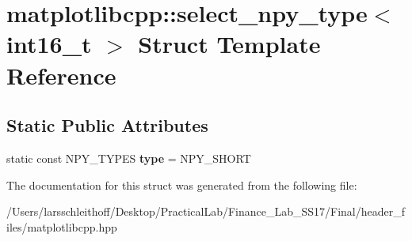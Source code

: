 \hypertarget{structmatplotlibcpp_1_1select__npy__type_3_01int16__t_01_4}{}\section{matplotlibcpp\+:\+:select\+\_\+npy\+\_\+type$<$ int16\+\_\+t $>$ Struct Template Reference}
\label{structmatplotlibcpp_1_1select__npy__type_3_01int16__t_01_4}
\subsection*{Static Public Attributes}
\begin{DoxyCompactItemize}
\item 
\mbox{\label{structmatplotlibcpp_1_1select__npy__type_3_01int16__t_01_4_aa7e1803c594ccc58c2cd4c8818d5a158}} 
static const N\+P\+Y\+\_\+\+T\+Y\+P\+ES {\bfseries type} = N\+P\+Y\+\_\+\+S\+H\+O\+RT
\end{DoxyCompactItemize}


The documentation for this struct was generated from the following file\+:\begin{DoxyCompactItemize}
\item 
/\+Users/larsschleithoff/\+Desktop/\+Practical\+Lab/\+Finance\+\_\+\+Lab\+\_\+\+S\+S17/\+Final/header\+\_\+files/matplotlibcpp.\+hpp\end{DoxyCompactItemize}
